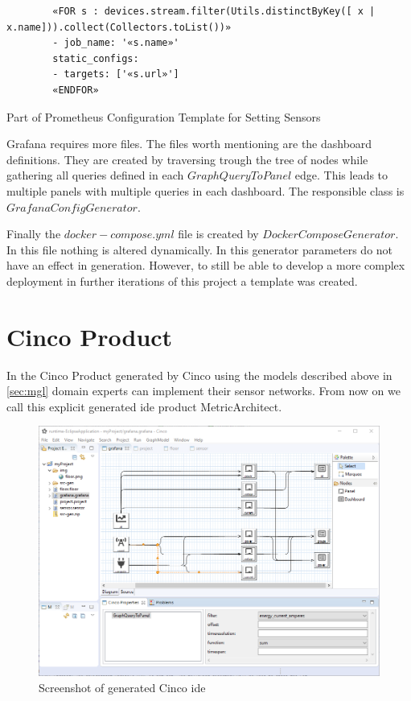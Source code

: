 \begin{listing}
	\begin{verbatim}
		«FOR s : devices.stream.filter(Utils.distinctByKey([ x | x.name])).collect(Collectors.toList())»
		- job_name: '«s.name»'
		static_configs:
		- targets: ['«s.url»']
		«ENDFOR»
	\end{verbatim}
	\caption{Part of Prometheus Configuration Template for Setting Sensors}
	\label{lst:xtend_prom}
\end{listing} 

Grafana requires more files. The files worth mentioning are the dashboard definitions. They are created by traversing trough the tree of nodes while gathering all queries defined in each $GraphQueryToPanel$ edge. This leads to multiple panels with multiple queries in each dashboard. The responsible class is $GrafanaConfigGenerator$.

Finally the $docker-compose.yml$ file is created by $DockerComposeGenerator$. In this file nothing is altered dynamically. In this generator parameters do not have an effect in generation. However, to still be able to develop a more complex deployment in further iterations of this project a template was created.

\section{Cinco Product}

In the Cinco Product generated by Cinco using the models described above in \cref{sec:mgl} domain experts can implement their sensor networks. From now on we call this explicit generated \gls{ide} product MetricArchitect. 

\begin{figure}
	\includegraphics[width=\textwidth]{assets/images/editor}
	\caption{Screenshot of generated Cinco \gls{ide}}
	\label{fig:editor}
\end{figure}

